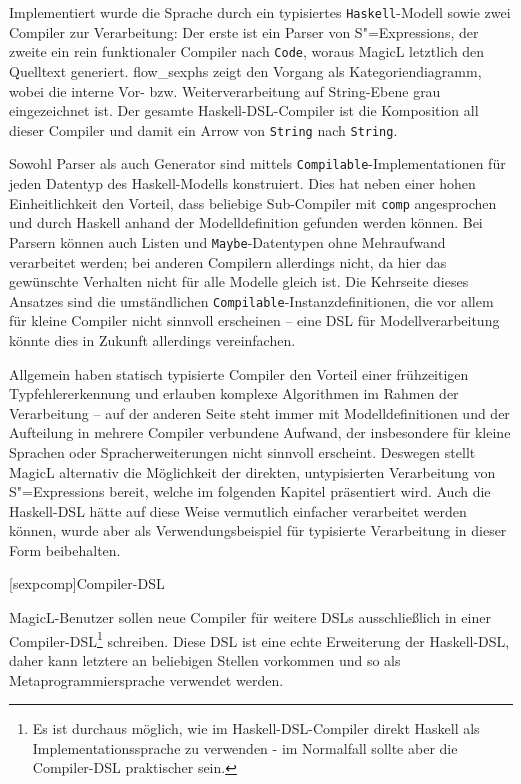 \documentclass[12pt, a4paper, bibgerm]{scrbook}
\newcommand\icode[1]{\lstinline?#1?}
\newcommand\lchapter{}
\newcommand\abb{}
\newcommand{\sexps}{S"=Expressions}
\begin{document}
Implementiert wurde die Sprache durch ein typisiertes
\icode{Haskell}-Modell sowie zwei Compiler zur Verarbeitung: Der erste
ist ein Parser von \sexps{}, der zweite ein rein funktionaler Compiler
nach \icode{Code}, woraus MagicL letztlich den Quelltext
generiert. \abb{flow_sexphs} zeigt den Vorgang als Kategoriendiagramm,
wobei die interne Vor- bzw. Weiterverarbeitung auf
String-Ebene grau eingezeichnet ist. Der gesamte Haskell-DSL-Compiler
ist die Komposition all dieser Compiler und damit ein Arrow von
\icode{String} nach \icode{String}.

Sowohl Parser als auch Generator sind mittels
\icode{Compilable}-Implementationen für jeden Datentyp des
Haskell-Modells konstruiert. Dies hat neben einer hohen Einheitlichkeit
den Vorteil, dass beliebige Sub-Compiler mit \icode{comp} angesprochen
und durch Haskell anhand der Modelldefinition gefunden werden
können. Bei Parsern können auch Listen und \icode{Maybe}-Datentypen ohne
Mehraufwand verarbeitet werden; bei anderen Compilern allerdings nicht,
da hier das gewünschte Verhalten nicht für alle Modelle gleich ist. Die
Kehrseite dieses Ansatzes sind die umständlichen
\icode{Compilable}-Instanzdefinitionen, die vor allem für kleine
Compiler nicht sinnvoll erscheinen -- eine DSL für Modellverarbeitung
könnte dies in Zukunft allerdings vereinfachen.

Allgemein haben statisch typisierte Compiler den Vorteil einer
frühzeitigen Typfehlererkennung und erlauben komplexe Algorithmen im
Rahmen der Verarbeitung -- auf der anderen Seite steht immer mit
Modelldefinitionen und der Aufteilung in mehrere Compiler verbundene
Aufwand, der insbesondere für kleine Sprachen oder Spracherweiterungen
nicht sinnvoll erscheint. Deswegen stellt MagicL alternativ die
Möglichkeit der direkten, untypisierten Verarbeitung von \sexps{}
bereit, welche im folgenden Kapitel präsentiert wird. Auch die
Haskell-DSL hätte auf diese Weise vermutlich einfacher verarbeitet
werden können, wurde aber als Verwendungsbeispiel für typisierte
Verarbeitung in dieser Form beibehalten.

\lchapter[sexpcomp]{Compiler-DSL}

MagicL-Benutzer sollen neue Compiler für weitere DSLs ausschließlich in
einer Compiler-DSL\footnote{Es ist durchaus möglich, wie im
  Haskell-DSL-Compiler direkt Haskell als Implementationssprache zu
  verwenden - im Normalfall sollte aber die Compiler-DSL praktischer
  sein.} schreiben. Diese DSL ist eine echte Erweiterung der
Haskell-DSL, daher kann letztere an beliebigen Stellen vorkommen
und so als Metaprogrammiersprache verwendet werden.
\end{document}
